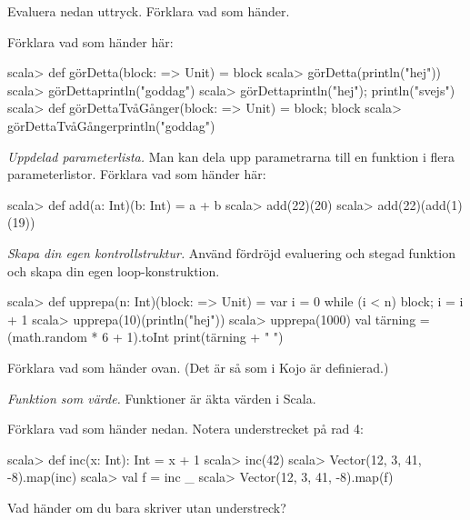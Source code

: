 Evaluera nedan uttryck. Förklara vad som händer.

\Subtask {}

\Subtask {}

\Subtask {}

\Subtask {}

\Subtask {}

\Subtask {}


\Subtask Förklara vad som händer här:
\begin{REPL}
scala> def görDetta(block: => Unit) = block
scala> görDetta(println("hej"))
scala> görDetta{println("goddag")}
scala> görDetta{println("hej"); println("svejs")}
scala> def görDettaTvåGånger(block: => Unit) = {block; block}
scala> görDettaTvåGånger{println("goddag")}
\end{REPL}


\Task \emph{Uppdelad parameterlista.} Man kan dela upp parametrarna till en funktion i flera parameterlistor. Förklara vad som händer här:
\begin{REPL}
scala> def add(a: Int)(b: Int) = a + b
scala> add(22)(20)
scala> add(22)(add(1)(19))
\end{REPL}


\Task \emph{Skapa din egen kontrollstruktur.} Använd fördröjd evaluering och stegad funktion och skapa din egen loop-konstruktion.
\begin{REPL}
scala> def upprepa(n: Int)(block: => Unit) = {
         var i = 0
         while (i < n) {block; i = i + 1}
       }
scala> upprepa(10)(println("hej"))
scala> upprepa(1000){
  val tärning = (math.random * 6 + 1).toInt
  print(tärning + " ")
}
\end{REPL}
Förklara vad som händer ovan. (Det är så som  i Kojo är definierad.)


\Task \emph{Funktion som värde.} Funktioner är äkta värden i Scala.

\Subtask \label{subtask:funcval} Förklara vad som händer nedan. Notera understrecket på rad 4:

\begin{REPL}[numbers=left, numberstyle=\color{black}\ttfamily\scriptsize\selectfont]
scala> def inc(x: Int): Int = x + 1
scala> inc(42)
scala> Vector(12, 3, 41, -8).map(inc)
scala> val f = inc _
scala> Vector(12, 3, 41, -8).map(f)
\end{REPL}

\Subtask Vad händer om du bara skriver  utan understreck?

